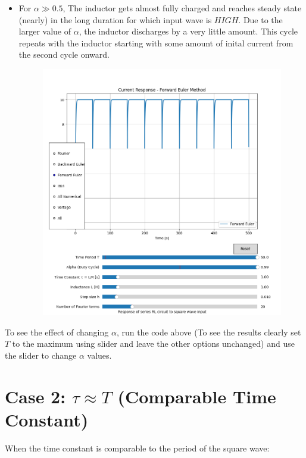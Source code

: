 \documentclass[12pt,a4paper]{report}
\begin{document}
\begin{itemize}
\begin{itemize}
        \item For $\alpha \gg 0.5$, The inductor gets almost fully charged and reaches steady state (nearly) in the long duration for which input wave is $HIGH$. Due to the larger value of $\alpha$, the inductor discharges by a very little amount. This cycle repeats with the inductor starting with some amount of inital current from the second cycle onward.
        \pagebreak
        \begin{figure}[h!]
	   \centering
	   \includegraphics[scale=0.6]{figs/tau<<T-3.png}
        \end{figure}
    \end{itemize}
 
    To see the effect of changing $\alpha$, run the code above (To see the results clearly set $T$ to the maximum using slider and leave the other options unchanged) and use the slider to change $\alpha$ values.
    
\end{itemize}

\section{Case 2: $\tau \approx T$ (Comparable Time Constant)}
When the time constant is comparable to the period of the square wave:
\end{document}
